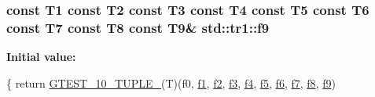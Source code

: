 \subsubsection[{f9}]{\setlength{\rightskip}{0pt plus 5cm}const T1 const T2 const T3 const T4 const T5 const T6 const T7 const T8 const T9\& std\+::tr1\+::f9}\label{namespacestd_1_1tr1_a216d2c7cdfaaf415caba2f88e2c34413}
{\bfseries Initial value\+:}
\begin{DoxyCode}
\{
  \textcolor{keywordflow}{return} \hyperlink{gtest-tuple_8h_a275e7bcd84299cc44b9c1dba971951c4}{GTEST\_10\_TUPLE\_}(T)(f0, \hyperlink{namespacestd_1_1tr1_a9c0fa65b105f8e2f58ba59ecf75fd000}{f1}, \hyperlink{namespacestd_1_1tr1_a87dd9e009868361317f587126dba63d4}{f2}, \hyperlink{namespacestd_1_1tr1_a0f7c3b47d27d42d82d1a333ea420ce4e}{f3}, \hyperlink{namespacestd_1_1tr1_adc796e02b7385d526aff708189564f67}{f4}, \hyperlink{namespacestd_1_1tr1_a9c1eb66b2b2fa321942af95405232a0d}{f5}, \hyperlink{namespacestd_1_1tr1_a6b62f32e1e3e21bceb94eb46c4cbfd56}{f6}, 
      \hyperlink{namespacestd_1_1tr1_a2185f3a1c07f2df072c39cb91ffa89a4}{f7}, \hyperlink{namespacestd_1_1tr1_ab998afa41cea8d6d26d7e4288b0bf974}{f8}, \hyperlink{namespacestd_1_1tr1_a216d2c7cdfaaf415caba2f88e2c34413}{f9})
\end{DoxyCode}

